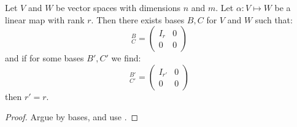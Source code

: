 \documentclass[../Main.tex]{subfiles}
\begin{document}
\begin{theorem}
    Let $V$ and $W$ be vector spaces with dimensions $n$ and $m$. Let $\alpha : V \mapsto W$ be a linear map with rank $r$. Then there exists bases $B, C$ for $V$ and $W$ such that:
    \begin{equation*}
        [\alpha]^B_C =
        \begin{pmatrix}
            I_r & 0 \\
            0 & 0
        \end{pmatrix}
    \end{equation*}
    and if for some bases $B', C'$ we find:
    \begin{equation*}
        [\alpha]^{B'}_{C'} =
        \begin{pmatrix}
            I_{r'} & 0 \\
            0 & 0
        \end{pmatrix}
    \end{equation*}
    then $r' = r$.
    \label{thmLinMapIdentityBasis}
\end{theorem}
\begin{proof}
    Argue by bases, and use .
\end{proof}
\end{document}
